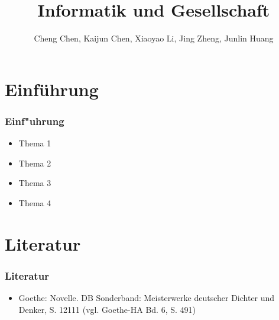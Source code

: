 \documentclass[ddcfooter]{tudbeamer}
\begin{document}
\title[Informatik und Gesellschaft]{Informatik und Gesellschaft}
\author{Cheng Chen, Kaijun Chen, Xiaoyao Li, Jing Zheng, Junlin Huang}
\maketitle

\section{Einführung}
\begin{frame}
\frametitle{Einf"uhrung}
\begin{itemize}
\item Thema 1
\item Thema 2
\item Thema 3
\item Thema 4
\end{itemize}
\end{frame}

\section{Literatur}
\begin{frame}
\frametitle*{Literatur}
\begin{itemize}
\item Goethe: Novelle. DB Sonderband: Meisterwerke deutscher Dichter und Denker, S. 12111 (vgl. Goethe-HA Bd. 6, S. 491)
\end{itemize}
\end{frame}

 
\end{document}
